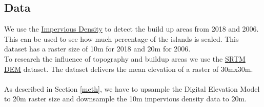 \documentclass[10pt, twocolumn, twoside]{article}
\begin{document}
	
	


\subsection{Data}\label{data}
We use the \href{https://land.copernicus.eu/en/map-viewer?product=d06a27c960dd43dea8d33400aa04556c}{Impervious
Density} to detect the build up areas from 2018 and 2006. This can be used to see how much
percentage of the islands is sealed. This dataset has a raster size of 10m for 2018 and 20m for 2006.\\
To research the influence of topography and buildup areas we use the
\href{https://earthexplorer.usgs.gov}{SRTM DEM} dataset. The dataset delivers the mean elevation of a raster of 30mx30m. \\\\
As described in Section \ref{meth}, we have to upsample the Digital Elevation Model to 20m raster size and downsample the 10m impervious density data to 20m.
\end{document}
